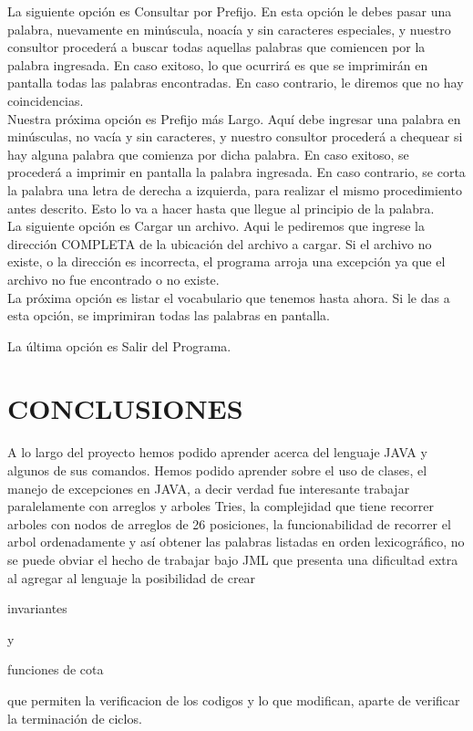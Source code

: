 \documentclass{article}
\begin{document}
{    La siguiente opci\'on es Consultar por Prefijo. En esta opci\'on le debes pasar una palabra, nuevamente en min\'uscula, noac\'ia y sin caracteres especiales, y nuestro consultor proceder\'a a buscar todas aquellas palabras que comiencen por la palabra ingresada. En caso exitoso, lo que ocurrir\'a es que se imprimir\'an en pantalla todas las palabras encontradas. En caso contrario, le diremos que no hay coincidencias.\\

    Nuestra pr\'oxima opci\'on es Prefijo m\'as Largo. Aqu\'i debe ingresar una palabra en min\'usculas, no vac\'ia y sin caracteres, y nuestro consultor proceder\'a a chequear si hay alguna palabra que comienza por dicha palabra. En caso exitoso, se proceder\'a  a imprimir en pantalla la palabra ingresada. En caso contrario, se corta la palabra una letra de derecha a izquierda, para realizar el mismo procedimiento antes descrito. Esto lo va a hacer hasta que llegue al principio de la palabra.\\

    La siguiente opci\'on es Cargar un archivo. Aqui le pediremos que ingrese la direcci\'on COMPLETA de la ubicaci\'on del archivo a cargar. Si el archivo  no existe, o la direcci\'on es incorrecta, el programa arroja una excepci\'on ya que el archivo no fue encontrado o no existe.\\

    La pr\'oxima opci\'on es listar  el vocabulario que tenemos hasta ahora. Si le das a esta opci\'on, se imprimiran todas las palabras en pantalla.

    La \'ultima opci\'on es Salir del Programa.

     
\newpage

\section{CONCLUSIONES}

    A lo largo del proyecto hemos podido aprender acerca del lenguaje JAVA y algunos de  sus comandos. Hemos podido aprender sobre el uso de clases, el manejo de excepciones en JAVA, a decir verdad fue interesante trabajar paralelamente con arreglos y arboles Tries, la complejidad que tiene recorrer arboles con nodos de arreglos de 26 posiciones, la funcionabilidad de recorrer el arbol ordenadamente y as\'i obtener las palabras listadas en orden lexicogr\'afico, no se puede obviar el hecho de trabajar bajo JML que presenta una dificultad extra al agregar al lenguaje la posibilidad de crear \begin{bf}{invariantes}\end{bf} y \begin{bf}{funciones de cota}\end{bf} que permiten la verificacion de los codigos y lo que modifican, aparte de verificar la terminaci\'on de ciclos.\\
   

}
\end{document}
